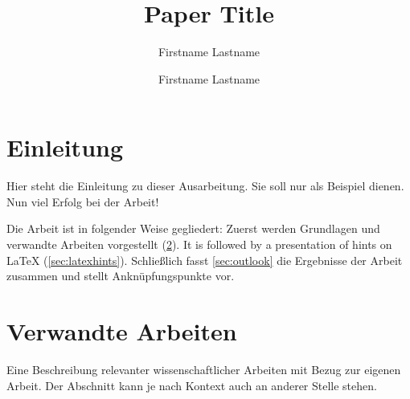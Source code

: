 \documentclass[runningheads,a4paper,ngerman]{llncs}[2022/01/12]
\begin{document}
\ifluatex
\fi

\title{Paper Title}

\author{Firstname Lastname \and Firstname Lastname}



%
%

\maketitle

\begin{abstract}
\lipsum[1]

\end{abstract}


\section{Einleitung}
\label{sec:introduction}
Hier steht die Einleitung zu dieser Ausarbeitung.
Sie soll nur als Beispiel dienen.
Nun viel Erfolg bei der Arbeit!

Die Arbeit ist in folgender Weise gegliedert:
Zuerst werden Grundlagen und verwandte Arbeiten vorgestellt (\cref{sec:relatedwork}).
It is followed by a presentation of hints on \LaTeX{} (\cref{sec:latexhints}).
Schließlich fasst \cref{sec:outlook} die Ergebnisse der Arbeit zusammen und stellt Anknüpfungspunkte vor.

\section{Verwandte Arbeiten}
\label{sec:relatedwork}

Eine Beschreibung relevanter wissenschaftlicher Arbeiten mit Bezug zur eigenen Arbeit.
Der Abschnitt kann je nach Kontext auch an anderer Stelle stehen.
\end{document}
